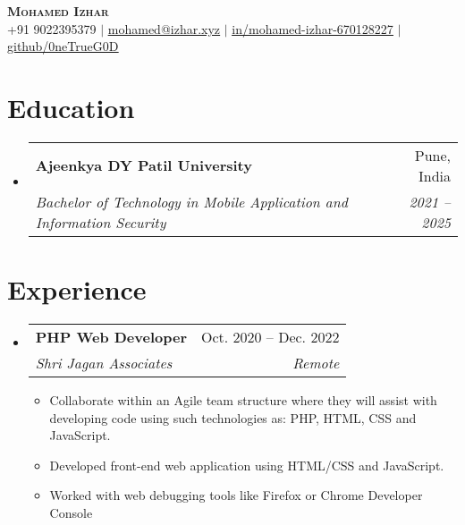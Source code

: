 \documentclass[letterpaper,12pt]{article}
\makeatletter
\newcommand{\resumeItem}[1]{
  \item\small{
    {#1 \vspace{-2pt}}
  }
}
\newcommand{\resumeSubheading}[4]{
  \vspace{-2pt}\item
    \begin{tabular*}{0.97\textwidth}[t]{l@{\extracolsep{\fill}}r}
      \textbf{#1} & #2 \\
      \textit{\small#3} & \textit{\small #4} \\
    \end{tabular*}\vspace{-7pt}
}
\newcommand{\resumeSubSubheading}[2]{
    \item
    \begin{tabular*}{0.97\textwidth}{l@{\extracolsep{\fill}}r}
      \textit{\small#1} & \textit{\small #2} \\
    \end{tabular*}\vspace{-7pt}
}
\newcommand{\resumeSubHeadingListStart}{\begin{itemize}[leftmargin=0.15in, label={}]}
\newcommand{\resumeSubHeadingListEnd}{\end{itemize}}
\newcommand{\resumeItemListStart}{\begin{itemize}}
\newcommand{\resumeItemListEnd}{\end{itemize}\vspace{-5pt}}
\makeatother
\begin{document}
\begin{center}
    \textbf{\Huge \scshape Mohamed Izhar} \\ \vspace{1pt}
    \small +91 9022395379 $|$ \href{mailto:mohamed@izhar.xyz}{\underline{mohamed@izhar.xyz}} $|$ 
    \href{https://www.linkedin.com/in/mohamed-izhar-670128227}{\underline{in/mohamed-izhar-670128227}} $|$
    \href{https://github.com/0neTrueG0D}{\underline{github/0neTrueG0D}}
\end{center}


\section{Education}
  \resumeSubHeadingListStart
    \resumeSubheading
      {Ajeenkya DY Patil University}{Pune, India}
      {Bachelor of Technology in Mobile Application and Information Security}{2021 -- 2025}
  \resumeSubHeadingListEnd


\section{Experience}
  \resumeSubHeadingListStart

    \resumeSubheading
      {PHP Web Developer}{Oct. 2020 -- Dec. 2022}
      {Shri Jagan Associates}{Remote}
      \resumeItemListStart
        \resumeItem{Collaborate within an Agile team structure where they will assist with developing code using such technologies as: PHP, HTML, CSS and JavaScript.}
        \resumeItem{Developed front-end web application using HTML/CSS and JavaScript.}
        \resumeItem{Worked with web debugging tools like Firefox or Chrome Developer Console}
      \resumeItemListEnd
      


  \resumeSubHeadingListEnd


\end{document}
